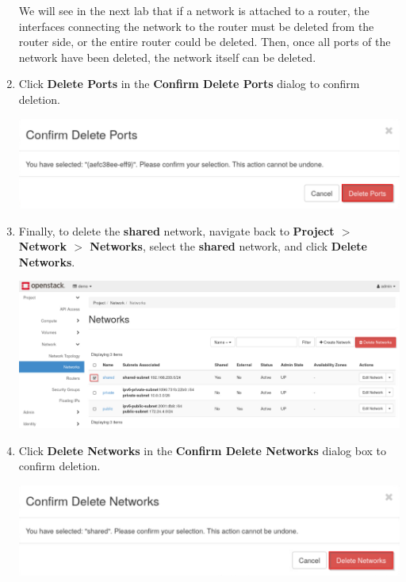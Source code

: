 \documentclass[letterpaper, 12pt]{article}
\begin{document}
\begin{enumerate}
    \begin{tipbox}
        We will see in the next lab that if a network is attached to a router, the interfaces connecting the network to
        the router must be deleted from the router side, or the entire router could be deleted. Then, once all ports of
        the network have been deleted, the network itself can be deleted.
    \end{tipbox}

    \item Click \textbf{Delete Ports} in the \textbf{Confirm Delete Ports} dialog to confirm deletion.

    \begin{center}
        \includegraphics[width=\linewidth]{images/part3/step4.png}
    \end{center}

    \item Finally, to delete the \textbf{shared} network, navigate back to \textbf{Project $>$ Network $>$ Networks},
    select the \textbf{shared} network, and click \textbf{Delete Networks}.

    \begin{center}
        \includegraphics[width=\linewidth]{images/part3/step5.png}
    \end{center}

    \item Click \textbf{Delete Networks} in the \textbf{Confirm Delete Networks} dialog box to confirm deletion.

    \begin{center}
        \includegraphics[width=\linewidth]{images/part3/step6.png}
    \end{center}


\end{enumerate}
\end{document}
